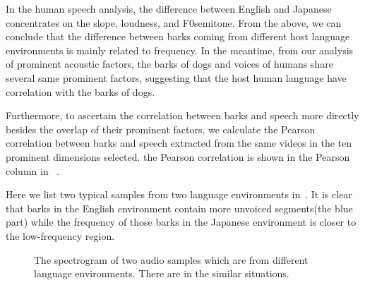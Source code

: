 

In the human speech analysis, the difference between English and Japanese concentrates on the slope, loudness, and F0semitone. From the above, we can conclude that the difference between barks coming from different host language environments is mainly related to frequency. In the meantime, from our analysis of prominent acoustic factors, the barks of dogs and voices of humans share several same prominent factors, suggesting that the host human language have correlation with the barks of dogs.

Furthermore, to ascertain the correlation between barks and speech more directly besides the overlap of their prominent factors, we calculate the Pearson correlation between barks and speech extracted from the same videos in the ten prominent dimensions selected. the Pearson correlation is shown in the Pearson column in ~.


Here we list two typical samples from two language environments in~. It is clear that barks in the English environment contain more unvoiced segments(the blue part) while the frequency of those barks in the Japanese environment is closer to the low-frequency region.

\begin{figure}[ht]
	\centering

	\caption{The spectrogram of two audio samples which are from different language environments. There are in the similar situations.}
	\label{Fig.sample}
\end{figure}


